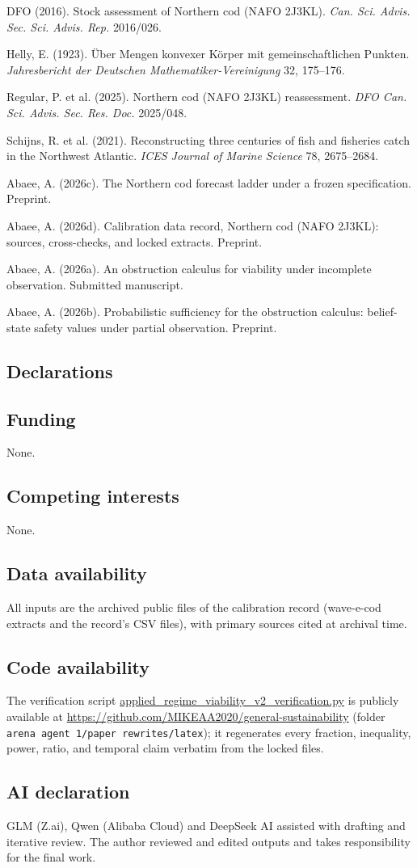 \documentclass[10pt,twocolumn]{article}
\theoremstyle{plain}
\theoremstyle{remark}
\begin{document}
{\footnotesize
DFO (2016). Stock assessment of Northern cod (NAFO 2J3KL). \emph{Can.
Sci. Advis. Sec. Sci. Advis. Rep.} 2016/026.

Helly, E. (1923). \"Uber Mengen konvexer K\"orper mit gemeinschaftlichen
Punkten. \emph{Jahresbericht der Deutschen Mathematiker-Vereinigung}
32, 175--176.

Regular, P. et al. (2025). Northern cod (NAFO 2J3KL) reassessment.
\emph{DFO Can. Sci. Advis. Sec. Res. Doc.} 2025/048.

Schijns, R. et al. (2021). Reconstructing three centuries of fish and
fisheries catch in the Northwest Atlantic. \emph{ICES Journal of Marine
Science} 78, 2675--2684.

Abaee, A. (2026c). The Northern cod forecast ladder under a frozen
specification. Preprint.

Abaee, A. (2026d). Calibration data record, Northern cod (NAFO 2J3KL):
sources, cross-checks, and locked extracts. Preprint.

Abaee, A. (2026a). An obstruction calculus for viability under
incomplete observation. Submitted manuscript.

Abaee, A. (2026b). Probabilistic sufficiency for the obstruction
calculus: belief-state safety values under partial observation.
Preprint.
}

\subsection*{Declarations}

\subsection*{Funding}
None.

\subsection*{Competing interests}
None.

\subsection*{Data availability}
All inputs are the archived public files of the calibration record
(wave-e-cod extracts and the record's CSV files), with primary sources
cited at archival time.

\subsection*{Code availability}
The verification script
\url{applied_regime_viability_v2_verification.py}
is publicly available at
\url{https://github.com/MIKEAA2020/general-sustainability} (folder
\texttt{arena agent 1/paper rewrites/latex}); it regenerates every
fraction, inequality, power, ratio, and temporal claim verbatim from
the locked files.

\subsection*{AI declaration}
GLM (Z.ai), Qwen (Alibaba Cloud) and DeepSeek AI assisted with drafting
and iterative review. The author reviewed and edited outputs and takes
responsibility for the final work.
\end{document}
